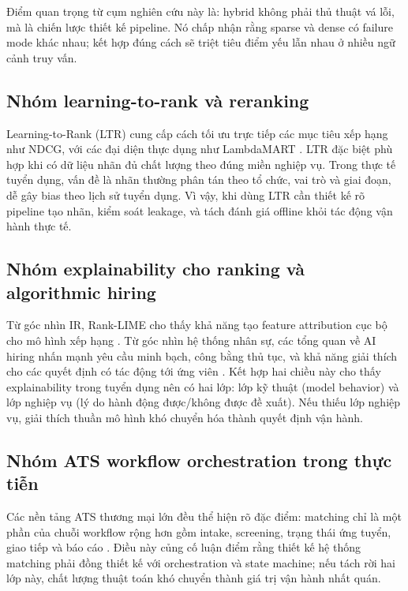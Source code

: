 Điểm quan trọng từ cụm nghiên cứu này là: hybrid không phải thủ thuật vá lỗi, mà là chiến lược thiết kế pipeline. Nó chấp nhận rằng sparse và dense có failure mode khác nhau; kết hợp đúng cách sẽ triệt tiêu điểm yếu lẫn nhau ở nhiều ngữ cảnh truy vấn.

\subsection{Nhóm learning-to-rank và reranking}

Learning-to-Rank (LTR) cung cấp cách tối ưu trực tiếp các mục tiêu xếp hạng như NDCG, với các đại diện thực dụng như LambdaMART \cite{lambdamart}. LTR đặc biệt phù hợp khi có dữ liệu nhãn đủ chất lượng theo đúng miền nghiệp vụ. Trong thực tế tuyển dụng, vấn đề là nhãn thường phân tán theo tổ chức, vai trò và giai đoạn, dễ gây bias theo lịch sử tuyển dụng. Vì vậy, khi dùng LTR cần thiết kế rõ pipeline tạo nhãn, kiểm soát leakage, và tách đánh giá offline khỏi tác động vận hành thực tế.

\subsection{Nhóm explainability cho ranking và algorithmic hiring}

Từ góc nhìn IR, Rank-LIME cho thấy khả năng tạo feature attribution cục bộ cho mô hình xếp hạng \cite{ranklime}. Từ góc nhìn hệ thống nhân sự, các tổng quan về AI hiring nhấn mạnh yêu cầu minh bạch, công bằng thủ tục, và khả năng giải thích cho các quyết định có tác động tới ứng viên \cite{ai-hiring-context,ethics-ai-recruiting}. Kết hợp hai chiều này cho thấy explainability trong tuyển dụng nên có hai lớp: lớp kỹ thuật (model behavior) và lớp nghiệp vụ (lý do hành động được/không được đề xuất). Nếu thiếu lớp nghiệp vụ, giải thích thuần mô hình khó chuyển hóa thành quyết định vận hành.

\subsection{Nhóm ATS workflow orchestration trong thực tiễn}

Các nền tảng ATS thương mại lớn đều thể hiện rõ đặc điểm: matching chỉ là một phần của chuỗi workflow rộng hơn gồm intake, screening, trạng thái ứng tuyển, giao tiếp và báo cáo \cite{greenhouse,lever,workday}. Điều này củng cố luận điểm rằng thiết kế hệ thống matching phải đồng thiết kế với orchestration và state machine; nếu tách rời hai lớp này, chất lượng thuật toán khó chuyển thành giá trị vận hành nhất quán.

